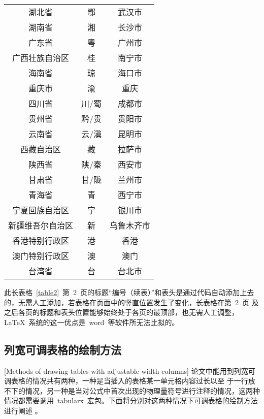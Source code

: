 \begin{longtable}{ccc}
湖北省 & 鄂 & 武汉市\\
湖南省 & 湘 & 长沙市\\
广东省 & 粤 & 广州市\\
广西壮族自治区 & 桂 & 南宁市\\
海南省 & 琼 & 海口市\\
重庆市 & 渝 & 重庆\\
四川省 & 川/蜀 & 成都市\\
贵州省 & 黔/贵 & 贵阳市\\
云南省 & 云/滇 & 昆明市\\
西藏自治区 & 藏 & 拉萨市\\
陕西省 & 陕/秦 & 西安市\\
甘肃省 & 甘/陇 & 兰州市\\
青海省 & 青 & 西宁市\\
宁夏回族自治区 & 宁 & 银川市\\
新疆维吾尔自治区 & 新 & 乌鲁木齐市\\
香港特别行政区 & 港 & 香港\\
澳门特别行政区 & 澳 & 澳门\\
台湾省 & 台 & 台北市\\
\end{longtable}\normalsize
\vspace{-1em}

此长表格~\ref{table2}~第~2~页的标题“编号（续表）”和表头是通过代码自动添加上去的，无需人工添加，若表格在页面中的竖直位置发生了变化，长表格在第~2~页
及之后各页的标题和表头位置能够始终处于各页的最顶部，也无需人工调整，\LaTeX~系统的这一优点是~word~等软件所无法比拟的。

\subsection{列宽可调表格的绘制方法}[Methods of drawing tables with adjustable-width columns]
论文中能用到列宽可调表格的情况共有两种，一种是当插入的表格某一单元格内容过长以至
于一行放不下的情况，另一种是当对公式中首次出现的物理量符号进行注释的情况，这两种
情况都需要调用~tabularx~宏包。下面将分别对这两种情况下可调表格的绘制方法进行阐述
。
